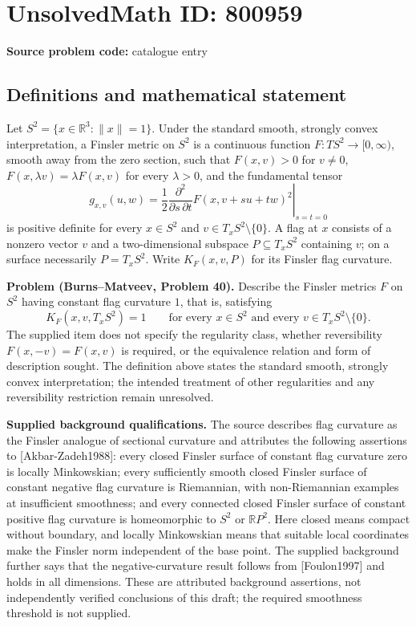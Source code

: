 \documentclass[11pt]{article}
\newcommand{\R}{\mathbb{R}}
\begin{document}
\section*{UnsolvedMath ID: 800959}
\textbf{Source problem code:} catalogue entry
\subsection{Definitions and mathematical statement}
Let \(S^2=\{x\in\R^3:\|x\|=1\}\). Under the standard smooth, strongly convex interpretation, a Finsler metric on \(S^2\) is a continuous function \(F:TS^2\to[0,\infty)\), smooth away from the zero section, such that \(F(x,v)>0\) for \(v\ne0\), \(F(x,\lambda v)=\lambda F(x,v)\) for every \(\lambda>0\), and the fundamental tensor
\[
g_{x,v}(u,w)=\left.\frac12\frac{\partial^2}{\partial s\,\partial t}F(x,v+su+tw)^2\right|_{s=t=0}
\]
is positive definite for every \(x\in S^2\) and \(v\in T_xS^2\setminus\{0\}\). A flag at \(x\) consists of a nonzero vector \(v\) and a two-dimensional subspace \(P\subseteq T_xS^2\) containing \(v\); on a surface necessarily \(P=T_xS^2\). Write \(K_F(x,v,P)\) for its Finsler flag curvature.

\textbf{Problem (Burns--Matveev, Problem 40).} Describe the Finsler metrics \(F\) on \(S^2\) having constant flag curvature \(1\), that is, satisfying
\[
K_F(x,v,T_xS^2)=1
\qquad\text{for every }x\in S^2\text{ and every }v\in T_xS^2\setminus\{0\}.
\]
The supplied item does not specify the regularity class, whether reversibility \(F(x,-v)=F(x,v)\) is required, or the equivalence relation and form of description sought. The definition above states the standard smooth, strongly convex interpretation; the intended treatment of other regularities and any reversibility restriction remain unresolved.

\textbf{Supplied background qualifications.} The source describes flag curvature as the Finsler analogue of sectional curvature and attributes the following assertions to [Akbar-Zadeh1988]: every closed Finsler surface of constant flag curvature zero is locally Minkowskian; every sufficiently smooth closed Finsler surface of constant negative flag curvature is Riemannian, with non-Riemannian examples at insufficient smoothness; and every connected closed Finsler surface of constant positive flag curvature is homeomorphic to \(S^2\) or \(\R P^2\). Here closed means compact without boundary, and locally Minkowskian means that suitable local coordinates make the Finsler norm independent of the base point. The supplied background further says that the negative-curvature result follows from [Foulon1997] and holds in all dimensions. These are attributed background assertions, not independently verified conclusions of this draft; the required smoothness threshold is not supplied.
\end{document}
